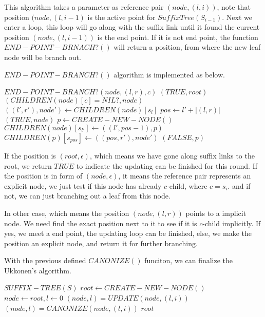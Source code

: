 \documentclass{article}
\begin{document}
This algorithm takes a parameter as reference pair $(node, (l, i))$, note that
position $(node, (l, i-1)$ is the active point for $SuffixTree(S_{i-1})$.
Next we enter a loop, this loop will go along with the suffix link until it
found the current position $(node, (l, i-1))$ is the end point. If it is not
end point, the function $END-POINT-BRNACH?()$ will return a position, from 
where the new leaf node will be branch out.

$END-POINT-BRANCH?()$ algorithm is implemented as below.

\begin{algorithmic}
\STATE $END-POINT-BRANCH?(node, (l, r), c)$
      \RETURN $(TRUE, root)$
    \ELSE
      \RETURN $(CHILDREN(node)[c] = NIL?, node)$
    \ENDIF
  \ELSE
    \STATE $((l', r'), node') \leftarrow CHILDREN(node)[s_l]$
    \STATE $pos \leftarrow l'+|(l, r)|$
      \RETURN $(TRUE, node)$
    \ELSE
      \STATE $p \leftarrow CREATE-NEW-NODE()$
      \STATE $CHILDREN(node)[s_{l'}] \leftarrow ((l', pos-1), p)$
      \STATE $CHILDREN(p)[s_{pos}] \leftarrow ((pos, r'), node')$
      \RETURN $(FALSE, p)$
    \ENDIF
  \ENDIF
\end{algorithmic}

If the position is $(root, \epsilon)$, which means we have gone along suffix links to
the root, we return $TRUE$ to indicate the updating can be finished for this round.
If the position is in form of $(node, \epsilon)$, it means the reference pair represents
an explicit node, we just test if this node has already $c$-child, where $c=s_i$. and
if not, we can just branching out a leaf from this node.

In other case, which means the position $(node, (l, r))$ points to a implicit node.
We need find the exact position next to it to see if it is $c$-child implicitly.
If yes, we meet a end point, the updating loop can be finished, else, we make
the position an explicit node, and return it for further branching.

With the previous defined $CANONIZE()$ funciton, we can finalize the Ukkonen's algorithm.

\begin{algorithmic}
\STATE $SUFFIX-TREE(S)$
  \STATE $root \leftarrow CREATE-NEW-NODE()$
  \STATE $node \leftarrow root, l \leftarrow 0$
    \STATE $(node, l) = UPDATE(node, (l, i))$
    \STATE $(node, l) = CANONIZE(node, (l, i))$
  \ENDFOR
  \RETURN $root$
\end{algorithmic}
\end{document}

